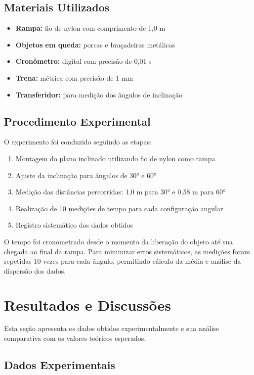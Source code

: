 \documentclass[a4paper, 12pt]{article}
\begin{document}
\subsection{Materiais Utilizados}
\begin{itemize}
	\item \textbf{Rampa:} fio de nylon com comprimento de 1,0 m
	\item \textbf{Objetos em queda:} porcas e braçadeiras metálicas
	\item \textbf{Cronômetro:} digital com precisão de 0,01 s
	\item \textbf{Trena:} métrica com precisão de 1 mm
	\item \textbf{Transferidor:} para medição dos ângulos de inclinação
\end{itemize}

\subsection{Procedimento Experimental}
O experimento foi conduzido seguindo as etapas:
\begin{enumerate}
 \item Montagem do plano inclinado utilizando fio de nylon como rampa
	\item Ajuste da inclinação para ângulos de 30° e 60°
	\item Medição das distâncias percorridas: 1,0 m para 30° e 0,58 m para 60°
	\item Realização de 10 medições de tempo para cada configuração angular
	\item Registro sistemático dos dados obtidos
\end{enumerate}

O tempo foi cronometrado desde o momento da liberação do objeto até sua chegada ao final da rampa. Para minimizar erros sistemáticos, as medições foram repetidas 10 vezes para cada ângulo, permitindo cálculo da média e análise da dispersão dos dados.

\section{Resultados e Discussões}
Esta seção apresenta os dados obtidos experimentalmente e sua análise comparativa com os valores teóricos esperados.

\subsection{Dados Experimentais}
\end{document}
